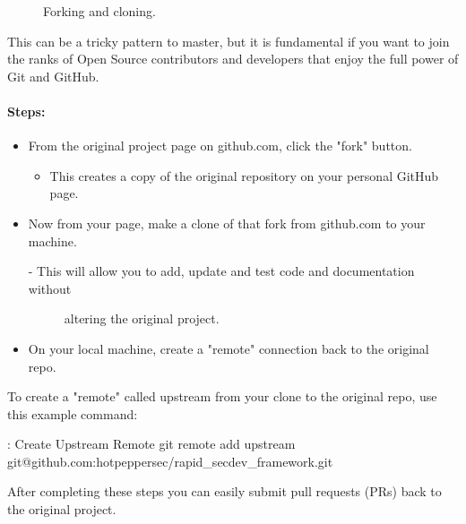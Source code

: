 \begin{figure}[!htb]
      
      \caption{Forking and cloning.}
\end{figure}

This can be a tricky pattern to master, but it is fundamental if you
want to join the ranks of Open Source contributors and developers that
enjoy the full power of Git and GitHub.


\paragraph{Steps:}

\begin{itemize}

      \item
            From the original project page on github.com, click the "fork" button.

            \begin{itemize}

                  \item
                        This creates a copy of the original repository on your personal
                        GitHub page.
            \end{itemize}
      \item
            Now from your page, make a clone of that fork from github.com to your
            machine.

            \begin{description}
                  \item[- This will allow you to add, update and test code and
                        documentation without]
                        altering the original project.
            \end{description}
      \item
            On your local machine, create a "remote" connection back to the
            original repo.
\end{itemize}

To create a "remote" called upstream from your clone to the original
repo, use this example command:

\begin{mybox}{\thetcbcounter: Create Upstream Remote}
      git remote add upstream git@github.com:hotpeppersec/rapid\_secdev\_framework.git
\end{mybox}

After completing these steps you can easily submit pull requests (PRs)
back to the original project.

